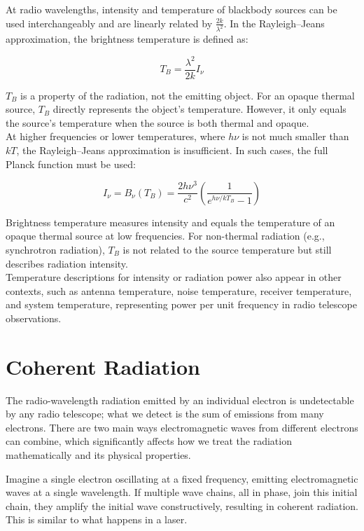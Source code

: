 At radio wavelengths, intensity and temperature of blackbody sources can be used interchangeably and are linearly related by \( \frac{2k}{\lambda^2} \). In the Rayleigh–Jeans approximation, the brightness temperature is defined as:

\[
T_B = \frac{\lambda^2}{2k} I_\nu
\]

\( T_B \) is a property of the radiation, not the emitting object. For an opaque thermal source, \( T_B \) directly represents the object's temperature. However, it only equals the source's temperature when the source is both thermal and opaque. \\

At higher frequencies or lower temperatures, where \( h\nu \) is not much smaller than \( kT \), the Rayleigh–Jeans approximation is insufficient. In such cases, the full Planck function must be used:

\[
I_\nu = B_\nu(T_B) = \frac{2h\nu^3}{c^2} \left( \frac{1}{e^{h\nu/kT_B} - 1} \right)
\]

Brightness temperature measures intensity and equals the temperature of an opaque thermal source at low frequencies. For non-thermal radiation (e.g., synchrotron radiation), \( T_B \) is not related to the source temperature but still describes radiation intensity. \\

Temperature descriptions for intensity or radiation power also appear in other contexts, such as antenna temperature, noise temperature, receiver temperature, and system temperature, representing power per unit frequency in radio telescope observations. \\

\clearpage

\section{Coherent Radiation}

The radio-wavelength radiation emitted by an individual electron is undetectable by any radio telescope; what we detect is the sum of emissions from many electrons. There are two main ways electromagnetic waves from different electrons can combine, which significantly affects how we treat the radiation mathematically and its physical properties.

Imagine a single electron oscillating at a fixed frequency, emitting electromagnetic waves at a single wavelength. If multiple wave chains, all in phase, join this initial chain, they amplify the initial wave constructively, resulting in coherent radiation. This is similar to what happens in a laser.

